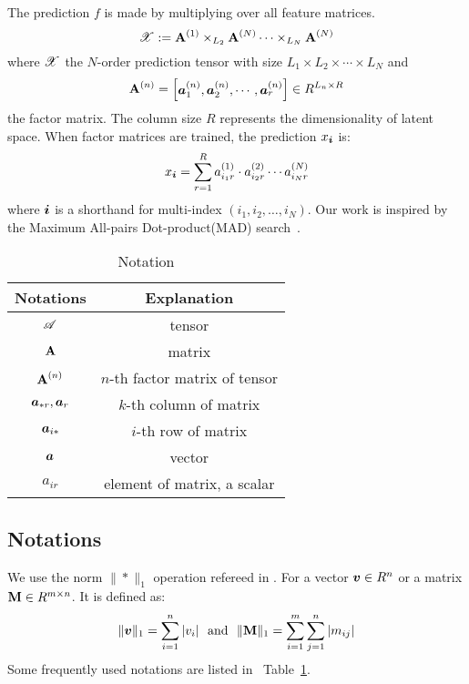 \documentclass[letterpaper]{article}
\newcommand{\Sca}[3]{{#1}^{(#2)}_{i_#2#3}}%
\newcommand{\T}[1]{\boldsymbol{\mathscr{\MakeUppercase{#1}}}}
\newcommand{\V}[1]{{\bm{{\MakeLowercase{#1}}}}}
\newcommand{\VnC}[3]{\V{#1}^{(#2)}_{#3}}
\newcommand{\M}[1]{{\bm{\mathbf{\MakeUppercase{#1}}}}}
\newcommand{\Mn}[2]{\M{#1}^{(#2)}}
\newcommand{\norm}[2]{\|#1\|_{#2}}
\newcommand{\Table}[1] {Table~\ref{table:#1}}
\newcommand{\Coord}{(i_1,i_2,\ldots,i_N)}
\begin{document}
The prediction $f$ is made by multiplying over all feature matrices.
\begin{equation}\label{eq:CPDecomposition}
    \T{X} := \Mn{A}{1}\times_{L_2}\Mn{A}{N}\cdots\times_{L_N}\Mn{A}{N}
\end{equation}
where $\T{X}$ the $N$-order prediction tensor with size $L_1\times L_2\times\cdots\times L_N$ and
\[
\M{A}^{(n)} =
\begin{bmatrix}
    \VnC{a}{n}{1},\VnC{a}{n}{2},\cdots,\VnC{a}{n}{r}
\end{bmatrix}  \in R^{L_n\times R}
\]
the factor matrix. The column size $R$ represents the dimensionality of latent space.
When factor matrices are trained, the prediction $x_\V{i}$ is:
\begin{equation}\label{eq:ValueInTensor}
x_\V{i} = \sum_{r=1}^{R}\Sca{a}{1}{r}\cdot\Sca{a}{2}{r}\cdots\Sca{a}{N}{r}
\end{equation}
where $\V{i}$ is a shorthand for multi-index $\Coord$.
Our work is inspired by the Maximum All-pairs Dot-product(MAD) search~\cite{BaPiKoSe15}.

\begin{table}[t]
  \label{table:Notation}
  \centering
  \begin{tabular}{|c|c|}
    \hline
    Notations & Explanation \\
    \hline
    $\T{A}$ & tensor \\
    $\M{A}$ & matrix \\
    $\Mn{A}{n}$ & $n$-th factor matrix of tensor\\
    $\V{A}_{*r},\V{A}_r$ & $k$-th column of matrix \\
    $\V{A}_{i*}$ & $i$-th row of matrix \\
    $\V{A}$ & vector \\
    $a_{ir}$ & element of matrix, a scalar\\
    \hline
  \end{tabular}
  \caption{Notation}
\end{table}

\subsection{Notations}

We use the norm $\norm{*}{1}$ operation refereed in \cite{BaPiKoSe15}.
For a vector $\V{v}\in R^n$ or a matrix $\M{M}\in R^{m\times n}$.
It is defined as:
\[
    \norm{\V{v}}{1} = \sum_{i=1}^{n}|v_i|
    \ \  {\rm and} \ \
    \norm{\M{M}}{1} = \sum_{i=1}^{m}\sum_{j=1}^{n}|m_{ij}|
\]
Some frequently used notations are listed in ~\Table{Notation}.
\end{document}
